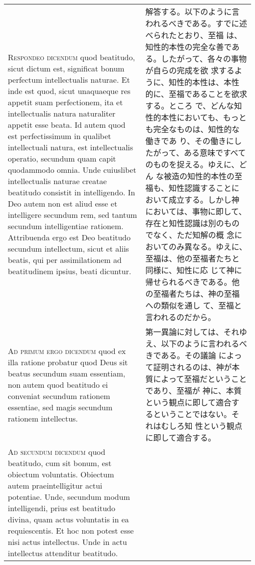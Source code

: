 \documentclass[10pt]{jsarticle} %
\begin{document}
\begin{longtable}{p{21em}p{21em}}
\\



{\scshape Respondeo dicendum} quod beatitudo, sicut dictum est, significat bonum
perfectum intellectualis naturae. Et inde est quod, sicut unaquaeque res
appetit suam perfectionem, ita et intellectualis natura naturaliter
appetit esse beata. Id autem quod est perfectissimum in qualibet
intellectuali natura, est intellectualis operatio, secundum quam capit
quodammodo omnia. Unde cuiuslibet intellectualis naturae creatae
beatitudo consistit in intelligendo. In Deo autem non est aliud esse et
intelligere secundum rem, sed tantum secundum intelligentiae
rationem. Attribuenda ergo est Deo beatitudo secundum intellectum, sicut
et aliis beatis, qui per assimilationem ad beatitudinem ipsius, beati
dicuntur.

&

解答する。以下のように言われるべきである。すでに述べられたとおり、至福
は、知性的本性の完全な善である。したがって、各々の事物が自らの完成を欲
求するように、知性的本性は、本性的に、至福であることを欲求する。ところ
で、どんな知性的本性においても、もっとも完全なものは、知性的な働きであ
り、その働きにしたがって、ある意味ですべてのものを捉える。ゆえに、どん
な被造の知性的本性の至福も、知性認識することにおいて成立する。しかし神
においては、事物に即して、存在と知性認識は別のものでなく、ただ知解の概
念においてのみ異なる。ゆえに、至福は、他の至福者たちと同様に、知性に応
じて神に帰せられるべきである。他の至福者たちは、神の至福への類似を通し
て、至福と言われるのだから。


\\



{\scshape Ad primum ergo dicendum} quod ex illa ratione probatur quod Deus sit
beatus secundum suam essentiam, non autem quod beatitudo ei conveniat
secundum rationem essentiae, sed magis secundum rationem intellectus.

&

第一異論に対しては、それゆえ、以下のように言われるべきである。その議論
によって証明されるのは、神が本質によって至福だということであり、至福が
神に、本質という観点に即して適合するということではない。それはむしろ知
性という観点に即して適合する。



\\



{\scshape Ad secundum dicendum} quod beatitudo, cum sit bonum, est
obiectum voluntatis. Obiectum autem praeintelligitur actui
potentiae. Unde, secundum modum intelligendi, prius est beatitudo
divina, quam actus voluntatis in ea requiescentis. Et hoc non potest
esse nisi actus intellectus. Unde in actu intellectus attenditur
beatitudo.


\end{longtable}
\end{document}
